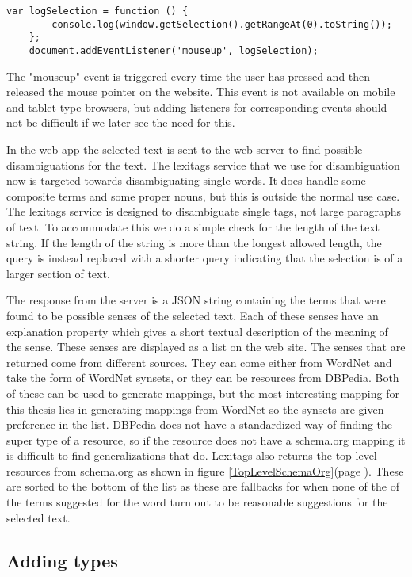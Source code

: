 \begin{lstlisting}[caption={Logging selected text}, label=DOMSelection]
	var logSelection = function () {
		console.log(window.getSelection().getRangeAt(0).toString());
	};
	document.addEventListener('mouseup', logSelection);
\end{lstlisting}

The "mouseup" event is triggered every time the user has pressed and then released the mouse pointer on the website.
This event is not available on mobile and tablet type browsers,
but adding listeners for corresponding events should not be difficult if we later see the need for this.

In the web app the selected text is sent to the web server to find possible disambiguations for the text.
The lexitags service that we use for disambiguation now is targeted towards disambiguating single words.
It does handle some composite terms and some proper nouns, but this is outside the normal use case.
The lexitags service is designed to disambiguate single tags, not large paragraphs of text.
To accommodate this we do a simple check for the length of the text string.
If the length of the string is more than the longest allowed length,
the query is instead replaced with a shorter query indicating that the selection is of a larger section of text.

The response from the server is a JSON string containing the terms that were found to be possible senses of the selected text.
Each of these senses have an explanation property which gives a short textual description of the meaning of the sense.
These senses are displayed as a list on the web site.
The senses that are returned come from different sources.
They can come either from WordNet and take the form of WordNet synsets, or they can be resources from DBPedia.
Both of these can be used to generate mappings,
but the most interesting mapping for this thesis lies in generating mappings from WordNet so the synsets are given preference in the list.
DBPedia does not have a standardized way of finding the super type of a resource,
so if the resource does not have a schema.org mapping it is difficult to find generalizations that do.
Lexitags also returns the top level resources from schema.org as shown in figure \ref{TopLevelSchemaOrg}(page \pageref{TopLevelSchemaOrg}).
These are sorted to the bottom of the list as these are fallbacks for when none of the of the terms suggested for
the word turn out to be reasonable suggestions for the selected text.

\subsection{Adding types}

